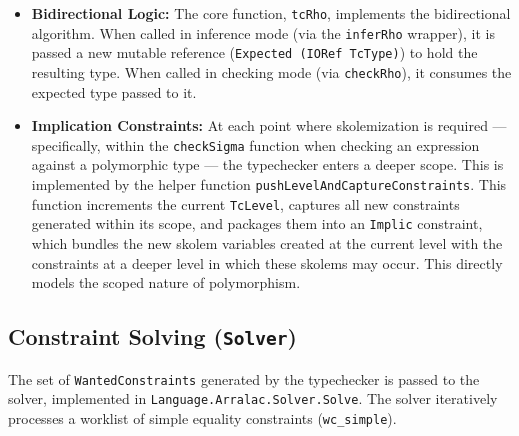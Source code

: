 \begin{itemize}
    \item \textbf{Bidirectional Logic:} The core function, \texttt{tcRho}, implements the bidirectional algorithm. When called in inference mode (via the \texttt{inferRho} wrapper), it is passed a new mutable reference (\texttt{Expected (IORef TcType)}) to hold the resulting type. When called in checking mode (via \texttt{checkRho}), it consumes the expected type passed to it.

    \item \textbf{Implication Constraints:} At each point where skolemization is required --- specifically, within the \texttt{checkSigma} function when checking an expression against a polymorphic type --- the typechecker enters a deeper scope. This is implemented by the helper function \texttt{pushLevelAndCaptureConstraints}. This function increments the current \texttt{TcLevel}, captures all new constraints generated within its scope, and packages them into an \texttt{Implic} constraint, which bundles the new skolem variables created at the current level with the constraints at a deeper level in which these skolems may occur. This directly models the scoped nature of polymorphism.
\end{itemize}

\subsection{Constraint Solving (\texttt{Solver})}
The set of \texttt{WantedConstraints} generated by the typechecker is passed to the solver, implemented in \texttt{Language.Arralac.Solver.Solve}. The solver iteratively processes a worklist of simple equality constraints (\texttt{wc\_simple}).

